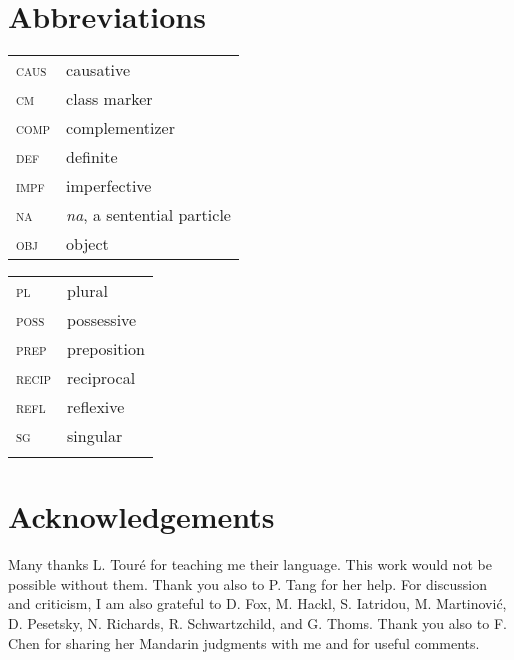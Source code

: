 \documentclass[output=paper]{langscibook}
\begin{document}
\section*{Abbreviations}

\begin{tabularx}{.5\textwidth}{@{}lX@{}}
\textsc{caus} & causative\\
\textsc{cm} & class marker\\
\textsc{comp} & complementizer\\
\textsc{def} & definite\\
\textsc{impf} & imperfective\\
\textsc{na} & \textit{na}, a sentential particle\\
\textsc{obj} & object\\
\end{tabularx}%
\begin{tabularx}{.5\textwidth}{@{}lX@{}}
\textsc{pl} & plural\\
\textsc{poss} & possessive\\  
\textsc{prep} & preposition\\
\textsc{recip} & reciprocal\\
\textsc{refl} & reflexive\\
\textsc{sg} & singular\\
&\\
\end{tabularx}



\section*{Acknowledgements}
Many thanks L. Tour\'{e} for teaching me their language. This work would not be possible without them. Thank you also to P. Tang for her help. For discussion and criticism, I am also grateful to D. Fox, M. Hackl, S. Iatridou, M. Martinovi\'{c}, D. Pesetsky, N. Richards, R. Schwartzchild, and G. Thoms. Thank you also to F. Chen for sharing her Mandarin judgments with me and for useful comments.

{\sloppy\printbibliography[heading=subbibliography,notkeyword=this]}
\end{document}
